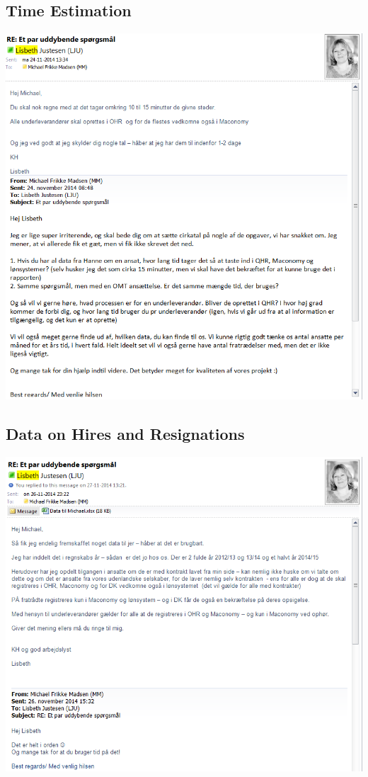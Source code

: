 \begin{linenumbers*}
\subsection{Time Estimation}
\label{app:lisbeth_time_estimation}
\includegraphics[width=1.36\textwidth]{appendix/lisbeth_communication_1}

\subsection{Data on Hires and Resignations}
\includegraphics[width=1.36\textwidth]{appendix/lisbeth_communication_2}



\end{linenumbers*}
